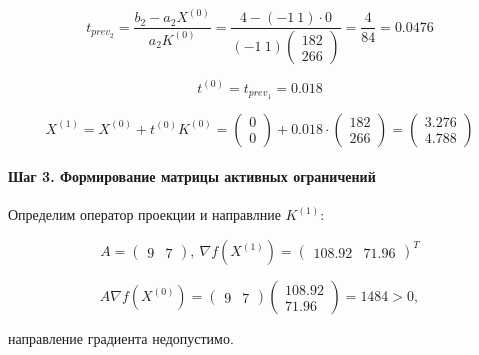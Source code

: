 \begin{equation*}
	t_{prev_2} = \frac{b_2 - a_2 X^{(0)}}{a_2 K^{(0)}} = \frac{4 - (-1\ 1) \cdot 0}{(-1\ 1) \begin{pmatrix} 182 \\ 266 \end{pmatrix}} = \frac{4}{84} = 0.0476
\end{equation*}

\begin{equation*}
	t^{(0)} = t_{prev_1} = 0.018
\end{equation*}

\begin{equation*}
	X^{(1)} = X^{(0)} + t^{(0)} K^{(0)} = \begin{pmatrix}
		0 \\ 0 
	\end{pmatrix}
	+
	0.018 \cdot \begin{pmatrix}
		182 \\ 266 
	\end{pmatrix}
	=
	\begin{pmatrix}
		3.276 \\ 4.788
	\end{pmatrix}
\end{equation*}

\paragraph{Шаг 3. Формирование матрицы активных ограничений}

Определим оператор проекции и направлние $K^{(1)}$:

\begin{equation*}
	A = \begin{pmatrix} 9 & 7 \end{pmatrix},\ %
	\nabla f(X^{(1)}) = \begin{pmatrix} 108.92 & 71.96 \end{pmatrix}^T
\end{equation*}

\begin{equation*}
	A \nabla f(X^{(0)}) = \begin{pmatrix} 9 & 7 \end{pmatrix}
	\begin{pmatrix} 108.92 \\ 71.96 \end{pmatrix}
	=
	1484
	> 0,
\end{equation*}

направление градиента недопустимо.

